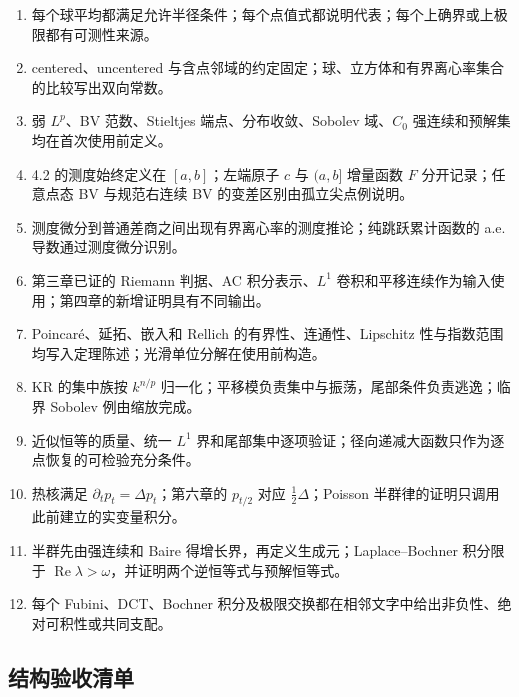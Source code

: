 \documentclass[11pt,a4paper]{ctexart}
\begin{document}
\begin{enumerate}
\item 每个球平均都满足允许半径条件；每个点值式都说明代表；每个上确界或上极限都有可测性来源。
\item centered、uncentered 与含点邻域的约定固定；球、立方体和有界离心率集合的比较写出双向常数。
\item 弱 $L^p$、BV 范数、Stieltjes 端点、分布收敛、Sobolev 域、$C_0$ 强连续和预解集均在首次使用前定义。
\item 4.2 的测度始终定义在 $[a,b]$；左端原子 $c$ 与 $(a,b]$ 增量函数 $F$ 分开记录；任意点态 BV 与规范右连续 BV 的变差区别由孤立尖点例说明。
\item 测度微分到普通差商之间出现有界离心率的测度推论；纯跳跃累计函数的 a.e. 导数通过测度微分识别。
\item 第三章已证的 Riemann 判据、AC 积分表示、$L^1$ 卷积和平移连续作为输入使用；第四章的新增证明具有不同输出。
\item Poincar\'e、延拓、嵌入和 Rellich 的有界性、连通性、Lipschitz 性与指数范围均写入定理陈述；光滑单位分解在使用前构造。
\item KR 的集中族按 $k^{n/p}$ 归一化；平移模负责集中与振荡，尾部条件负责逃逸；临界 Sobolev 例由缩放完成。
\item 近似恒等的质量、统一 $L^1$ 界和尾部集中逐项验证；径向递减大函数只作为逐点恢复的可检验充分条件。
\item 热核满足 $\partial_tp_t=\Delta p_t$；第六章的 $p_{t/2}$ 对应 $\tfrac12\Delta$；Poisson 半群律的证明只调用此前建立的实变量积分。
\item 半群先由强连续和 Baire 得增长界，再定义生成元；Laplace--Bochner 积分限于 $\operatorname{Re}\lambda>\omega$，并证明两个逆恒等式与预解恒等式。
\item 每个 Fubini、DCT、Bochner 积分及极限交换都在相邻文字中给出非负性、绝对可积性或共同支配。
\end{enumerate}

\subsection{结构验收清单}
\end{document}
